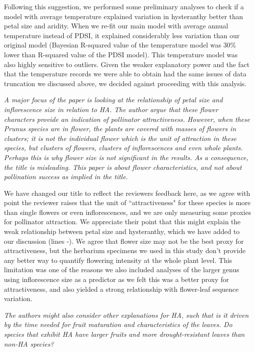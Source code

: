 \documentclass{article}[12pt]
\begin{document}
Following this suggestion, we performed some preliminary analyses to check if a model with average temperature explained variation in hysteranthy better than petal size and aridity. When we re-fit our main model with average annual temperature instead of PDSI, it explained considerably less variation than our original model (Bayesian R-squared value of the temperature model was 30\% lower than R-squared value of the PDSI model). This temperature model was also highly sensitive to outliers. Given the weaker explanatory power and the fact that the temperature records we were able to obtain had the same issues of data truncation we discussed above, we decided against proceeding with this analysis.


\emph{A major focus of the paper is looking at the relationship of petal size and inflorescence size in relation to HA. The author argue that these flower characters provide an indication of pollinator attractiveness. However, when these Prunus species are in flower, the plants are covered with masses of flowers in clusters; it is not the individual flower which is the unit of attraction in these species, but clusters of flowers, clusters of inflorescences and even whole plants. Perhaps this is why flower size is not significant in the results.
As a consequence, the title is misleading. This paper is about flower characteristics, and not about pollination success as implied in the title.}

We have changed our title to reflect the reviewers feedback here, as we agree with point the reviewer raises that the unit of ``attractiveness" for these species is more than single flowers or even inflorescences, and we are only measuring some proxies for pollinator attraction. We appreciate their point that this might explain the weak relationship between petal size and hysteranthy, which we have added to our discussion (lines -). We agree that flower size may not be the best proxy for attractiveness, but the herbarium specimens we used in this study don't provide any better way to quantify flowering intensity at the whole plant level. This limitation was one of the reasons we also included analyses of the larger genus using inflorescence size as a predictor as we felt this was a better proxy for attractiveness, and also yielded a strong relationship with flower-leaf sequence variation. 

\emph{The authors might also consider other explanations for HA, such that is it driven by the time needed for fruit maturation and characteristics of the leaves. Do species that exhibit HA have larger fruits and more drought-resistant leaves than non-HA species?}
\end{document}
